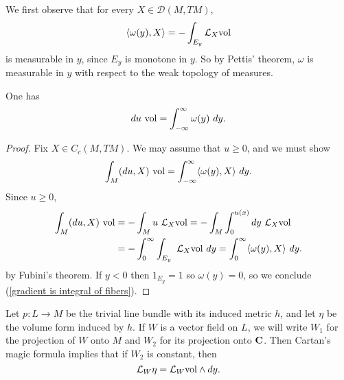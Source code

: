 We first observe that for every $X \in \mathcal D(M, TM)$,
$$\langle \omega(y), X\rangle = -\int_{E_y} \mathcal L_X\mathrm{vol}$$
is measurable in $y$, since $E_y$ is monotone in $y$.
So by Pettis' theorem, $\omega$ is measurable in $y$ with respect to the weak topology of measures.

\begin{lemma}\label{Coarea1}
One has
$$du ~\mathrm{vol} = \int_{-\infty}^\infty \omega(y) ~dy.$$
\end{lemma}
\begin{proof}
Fix $X \in C_c(M, TM)$. We may assume that $u \geq 0$, and we must show
\begin{equation}
\label{gradient is integral of fibers}
\int_M (du, X) ~\mathrm{vol} = \int_{-\infty}^\infty \langle \omega(y), X\rangle ~dy.
\end{equation}
Since $u \geq 0$,
\begin{align*}
\int_M (du, X) ~\mathrm{vol} &= -\int_M u~\mathcal L_X\mathrm{vol} = -\int_M \int_0^{u(x)} dy ~\mathcal L_X\mathrm{vol}\\
&= -\int_0^\infty \int_{E_y} ~\mathcal L_X\mathrm{vol} ~dy = \int_0^\infty \langle \omega(y), X\rangle ~dy.
\end{align*}
by Fubini's theorem.
If $y < 0$ then $1_{E_y} = 1$ so $\omega(y) = 0$, so we conclude (\ref{gradient is integral of fibers}).
\end{proof}

Let $p: L \to M$ be the trivial line bundle with its induced metric $h$, and let $\eta$ be the volume form induced by $h$.
If $W$ is a vector field on $L$, we will write $W_1$ for the projection of $W$ onto $M$ and $W_2$ for its projection onto $\mathbf{C}$.
Then Cartan's magic formula implies that if $W_2$ is constant, then
\begin{equation}
\label{Lie derivative computation}
\mathcal L_W\eta = \mathcal L_W\mathrm{vol} \wedge dy.
\end{equation}

